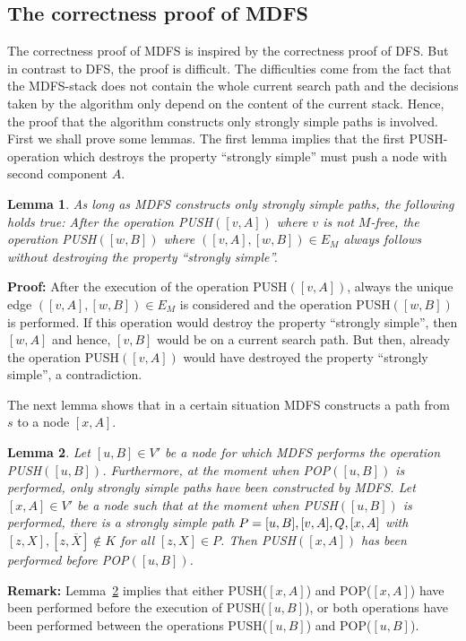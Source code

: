 \documentclass[12pt,twoside,a4paper]{article}
\def\QED{\hbox{\hskip 1pt \vrule width4pt height 6pt depth 1.5pt \hskip 1pt}}
\newtheorem{lemma}{Lemma}
\begin{document}
\subsection{The correctness proof of MDFS}

The correctness proof of MDFS is inspired by the correctness proof of DFS.
But in contrast to DFS, the proof is difficult. The difficulties come from the 
fact that the MDFS-stack does not contain the whole current search path and the 
decisions taken by the algorithm only depend on the content of the current stack.
Hence, the proof that the algorithm constructs only strongly simple paths is
involved. First we shall prove some lemmas. The first lemma implies that the first
PUSH-operation which destroys the property ``strongly simple'' must push 
a node with second component $A$.
\begin{lemma}
As long as MDFS constructs only strongly simple paths, the following holds true:
After the operation PUSH$([v,A])$ where $v$ is not $M$-free, the
operation PUSH$([w,B])$ where $([v,A],[w,B]) \in E_M$ always follows without 
destroying the property ``strongly simple''.
\end{lemma}
{\bf Proof:} 
After the execution of the operation PUSH$([v,A])$, always the unique edge 
$([v,A],[w,B]) \in E_M$ is considered and the operation PUSH$([w,B])$ is
performed. If this operation would destroy the property ``strongly simple'',
then $[w,A]$ and hence, $[v,B]$ would be on a current search path. But then,
already the operation PUSH$([v,A])$ would have destroyed the property ``strongly
simple'', a contradiction. 
\QED

\medskip
The next lemma shows that in a certain situation MDFS constructs a path from $s$ to a 
node $[x,A]$.
\begin{lemma} \label{Lemma1}
Let $[u,B]\in V'$ be a node for which MDFS performs the operation
PUSH$([u,B])$. Furthermore, at the moment when POP$([u,B])$ is performed, only strongly 
simple paths have been constructed by MDFS.
Let $[x,A]\in V'$ be a node such that at the moment when PUSH$([u,B])$ is 
performed, there is a strongly simple path
$P\space =\space [u,B],[v,A],Q,[x,A]$ with $[z,X],[z,\overline{X}] \not\in K$
for all $[z,X] \in P$. Then PUSH$([x,A])$ has been performed before POP$([u,B])$.
\end{lemma}
{\bf Remark:} Lemma~\ref{Lemma1} implies that either PUSH($[x,A]$) 
and POP($[x,A]$) have been performed before the execution of PUSH($[u,B]$), 
or both operations have been performed between the operations PUSH($[u,B]$) 
and POP($[u,B]$).
\end{document}
